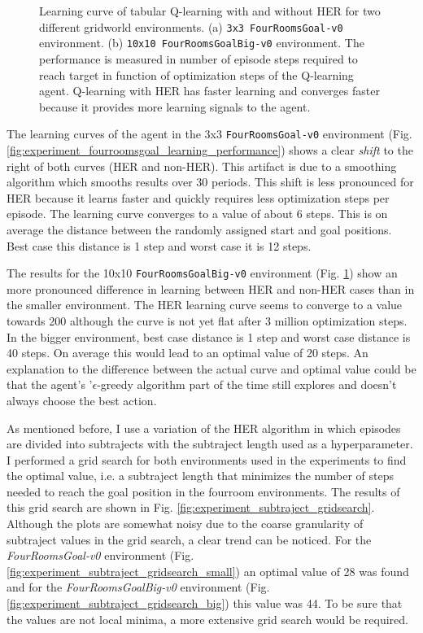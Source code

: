 \documentclass[conference]{IEEEtran}
\begin{document}
\begin{figure}[ht]
\begin{subfigure}[t]{0.45\textwidth}
\label{fig:experiment_fourroomsgoalbig_learning_performance}
\end{subfigure}
\caption{Learning curve of tabular Q-learning with and without HER for two different gridworld environments. (a) \texttt{3x3 FourRoomsGoal-v0} environment. (b) \texttt{10x10 FourRoomsGoalBig-v0} environment. The performance is measured in number of episode steps required to reach target in function of optimization steps of the Q-learning agent. Q-learning with HER has faster learning and converges faster because it provides more learning signals to the agent.}
\label{fig:experiment_tabular_qlearning_her}
\end{figure}

The learning curves of the agent in the 3x3 \texttt{FourRoomsGoal-v0} environment (Fig. \ref{fig:experiment_fourroomsgoal_learning_performance}) shows a clear \textit{shift} to the right of both curves (HER and non-HER). This artifact is due to a smoothing algorithm which smooths results over 30 periods. This shift is less pronounced for HER because it learns faster and quickly requires less optimization steps per episode. The learning curve converges to a value of about 6 steps. This is on average the distance between the randomly assigned start and goal positions. Best case this distance is 1 step and worst case it is 12 steps.

The results for the 10x10 \texttt{FourRoomsGoalBig-v0} environment (Fig. \ref{fig:experiment_fourroomsgoalbig_learning_performance}) show an more pronounced difference in learning between HER and non-HER cases than in the smaller environment. The HER learning curve seems to converge to a value towards 200 although the curve is not yet flat after 3 million optimization steps. In the bigger environment, best case distance is 1 step and worst case distance is 40 steps. On average this would lead to an optimal value of 20 steps. An explanation to the difference between the actual curve and optimal value could be that the agent's '$\epsilon$-greedy algorithm part of the time still explores and doesn't always choose the best action. 

As mentioned before, I use a variation of the HER algorithm in which episodes are divided into subtrajects with the subtraject length used as a hyperparameter. I performed a grid search for both environments used in the experiments to find the optimal value, i.e. a subtraject length that minimizes the number of steps needed to reach the goal position in the fourroom environments. The results of this grid search are shown in Fig. \ref{fig:experiment_subtraject_gridsearch}. Although the plots are somewhat noisy due to the coarse granularity of subtraject values in the grid search, a clear trend can be noticed. For the \textit{FourRoomsGoal-v0} environment (Fig. \ref{fig:experiment_subtraject_gridsearch_small}) an optimal value of 28 was found and for the \textit{FourRoomsGoalBig-v0} environment (Fig. \ref{fig:experiment_subtraject_gridsearch_big}) this value was 44. To be sure that the values are not local minima, a more extensive grid search would be required.
\end{document}
